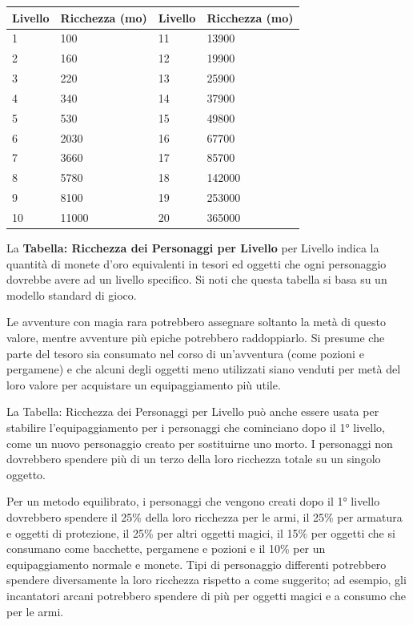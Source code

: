 \begin{multicols}{2}
\noindent\begin{tabularx}{0.50\textwidth}{XX|XX}
\textbf{Livello} & \textbf{Ricchezza (mo)} & \textbf{Livello} & \textbf{Ricchezza (mo)}\\
\toprule
1 & 100 & 11 & 13900\\
2 & 160 & 12 & 19900\\
3 & 220 & 13 & 25900\\
4 & 340 & 14 & 37900\\
5 & 530 & 15 & 49800\\
6 & 2030 & 16 & 67700\\
7 & 3660 & 17 & 85700\\
8 & 5780 & 18 & 142000\\
9 & 8100 & 19 & 253000\\
10 & 11000 & 20 & 365000
\end{tabularx}

\medskip

La \textbf{Tabella: Ricchezza dei Personaggi per Livello} per Livello indica la quantità di monete d'oro equivalenti in tesori ed oggetti che ogni personaggio dovrebbe avere ad un livello specifico. Si noti che questa tabella si basa su un modello standard di gioco.

Le avventure con magia rara potrebbero assegnare soltanto la metà di questo valore, mentre avventure più epiche potrebbero raddoppiarlo. Si presume che parte del tesoro sia consumato nel corso di un'avventura (come pozioni e pergamene) e che alcuni degli oggetti meno utilizzati siano venduti per metà del loro valore per acquistare un equipaggiamento più utile.

La Tabella: Ricchezza dei Personaggi per Livello può anche essere usata per stabilire l'equipaggiamento per i personaggi che cominciano dopo il 1° livello, come un nuovo personaggio creato per sostituirne uno morto. I personaggi non dovrebbero spendere più di un terzo della loro ricchezza totale su un singolo oggetto.

Per un metodo equilibrato, i personaggi che vengono creati dopo il 1° livello dovrebbero spendere il 25\% della loro ricchezza per le armi, il 25\% per armatura e oggetti di protezione, il 25\% per altri oggetti magici, il 15\% per oggetti che si consumano come bacchette, pergamene e pozioni e il 10\% per un equipaggiamento normale e monete. Tipi di personaggio differenti potrebbero spendere diversamente la loro ricchezza rispetto a come suggerito; ad esempio, gli incantatori arcani potrebbero spendere di più per oggetti magici e a consumo che per le armi.


\end{multicols}
